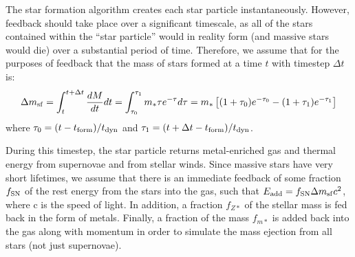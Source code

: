 

The star formation algorithm creates each star particle
instantaneously.  However, feedback should take place over a
significant timescale, as all of the stars contained within the ``star
particle'' would in reality form (and massive stars would die) over a
substantial period of time.  Therefore, we assume that for the
purposes of feedback that the mass of stars formed at a time $t$ with
timestep $\Delta t$ is:
\begin{equation}
\Delta m_{\rm sf} = \int_t^{t+\Delta t} \frac{dM}{dt} dt =
 \int_{\tau_0}^{\tau_1} m_* \tau e^{-\tau} d\tau =
 m_* \left[(1+\tau_0) e^{-\tau_0} - (1 + \tau_1) e^{-\tau_1} \right]
 \end{equation}
where $\tau_0 = (t-t_{\rm form})/t_{\rm dyn}$ and $\tau_1 = (t+\Delta t-t_{\rm form})/t_{\rm dyn}$.

%

During this timestep, the star particle returns
metal-enriched gas and thermal energy from supernovae and from stellar
winds.  Since massive stars have very short lifetimes, we assume that
there is an immediate feedback of some fraction $f_{\rm SN}$ of the rest
energy from the stars into the gas, such
that $E_{\rm add} = f_{\rm SN} \Delta m_{\rm sf} c^2$, where c is the speed of
light.  In addition, a fraction $f_{Z*}$ of the stellar mass is fed back 
in the form of metals.  Finally, a fraction of the mass $f_{m*}$
is added back into the gas
along with momentum in order to simulate the mass ejection from
all stars (not just supernovae).

